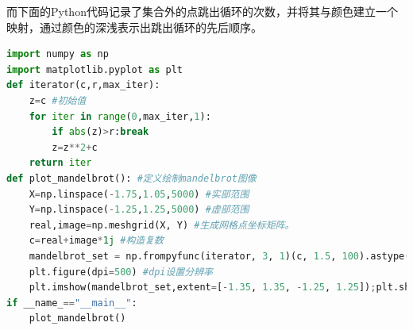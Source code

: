 \documentclass{ctexart}
\begin{document}
而下面的Python代码记录了集合外的点跳出循环的次数，并将其与颜色建立一个映射，通过颜色的深浅表示出跳出循环的先后顺序。
\begin{lstlisting}[language=Python]
import numpy as np
import matplotlib.pyplot as plt
def iterator(c,r,max_iter):
    z=c #初始值
    for iter in range(0,max_iter,1):
        if abs(z)>r:break
        z=z**2+c
    return iter
def plot_mandelbrot(): #定义绘制mandelbrot图像
    X=np.linspace(-1.75,1.05,5000) #实部范围
    Y=np.linspace(-1.25,1.25,5000) #虚部范围
    real,image=np.meshgrid(X, Y) #生成网格点坐标矩阵。
    c=real+image*1j #构造复数
    mandelbrot_set = np.frompyfunc(iterator, 3, 1)(c, 1.5, 100).astype(np.float) #frompyfunc(func, nin, nout)，
    plt.figure(dpi=500) #dpi设置分辨率
    plt.imshow(mandelbrot_set,extent=[-1.35, 1.35, -1.25, 1.25]);plt.show()
if __name_=="__main__":
    plot_mandelbrot()
\end{lstlisting}
\vspace{-0.5cm}
\end{document}
